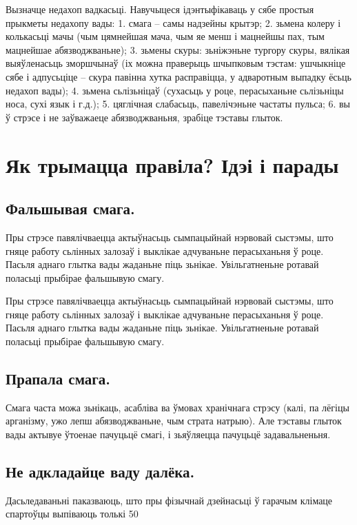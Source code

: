 Вызначце недахоп вадкасьці. Навучыцеся ідэнтыфікаваць у сябе простыя прыкметы недахопу вады:
1. смага – самы надзейны крытэр;
2. зьмена колеру і колькасьці мачы (чым цямнейшая мача, чым яе менш і мацнейшы пах, тым мацнейшае абязводжваньне);
3. зьмены скуры: зьніжэньне тургору скуры, вялікая выяўленасьць зморшчынаў (іх можна праверыць шчыпковым тэстам: ушчыкніце сябе і адпусьціце – скура павінна хутка расправіцца, у адваротным выпадку ёсьць недахоп вады);
4. зьмена сьлізьніцаў (сухасьць у роце, перасыханьне сьлізьніцы носа, сухі язык і г.д.);
5. цяглічная слабасьць, павелічэньне частаты пульса;
6. вы ў стрэсе і не заўважаеце абязводжваньня, зрабіце тэставы глыток.

\section{Як трымацца правіла? Ідэі і парады}

\subsection{Фальшывая смага.}
Пры стрэсе павялічваецца актыўнасьць сымпацыйнай нэрвовай сыстэмы, што гняце работу сьлінных залозаў і выклікае адчуваньне перасыханьня ў роце. Пасьля аднаго глытка вады жаданьне піць зьнікае. Увільгатненьне ротавай поласьці прыбірае фальшывую смагу.

Пры стрэсе павялічваецца актыўнасьць сымпацыйнай нэрвовай сыстэмы, што гняце работу сьлінных залозаў і выклікае адчуваньне перасыханьня ў роце. Пасьля аднаго глытка вады жаданьне піць зьнікае. Увільгатненьне ротавай поласьці прыбірае фальшывую смагу.

\subsection{Прапала смага.}
Смага часта можа зьнікаць, асабліва ва ўмовах хранічнага стрэсу (калі, па лёгіцы арганізму, ужо лепш абязводжваньне, чым страта натрыю). Але тэставы глыток вады актывуе ўтоенае пачуцьцё смагі, і зьяўляецца пачуцьцё задавальненьня.

\subsection{Не адкладайце ваду далёка.}
Дасьледаваньні паказваюць, што пры фізычнай дзейнасьці ў гарачым клімаце спартоўцы выпіваюць толькі 50%

